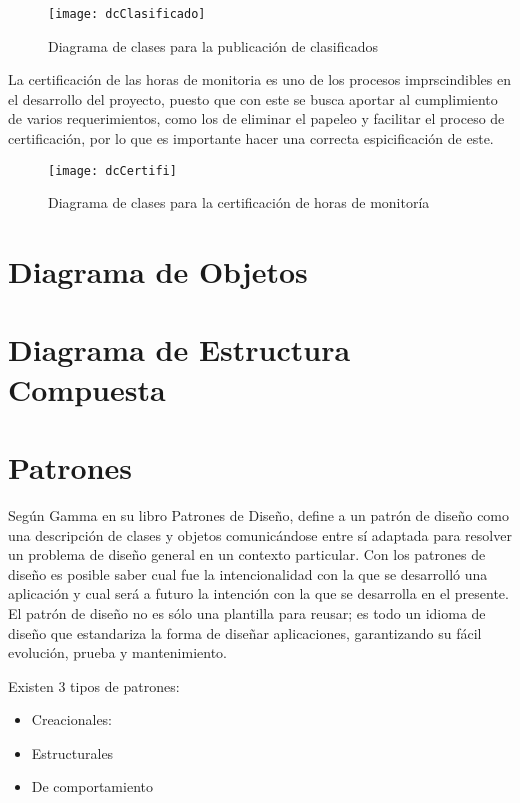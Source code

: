\begin{figure}[H]
	\centering
	\texttt{[image: dcClasificado]}
    \centering
    \caption{Diagrama de clases para la publicación de clasificados}
	\label{fig:dClaClasificado}
\end{figure}
\clearpage
La certificación de las horas de monitoria es uno de los procesos imprscindibles en el desarrollo del proyecto, puesto que con este se busca aportar al cumplimiento de varios requerimientos, como los de eliminar el papeleo y facilitar el proceso de certificación, por lo que es importante hacer una correcta espicificación de este.
\begin{figure}[H]
	\centering
	\texttt{[image: dcCertifi]}
    \centering
    \caption{Diagrama de clases para la certificación de horas de monitoría}
	\label{fig:dClaCertifi}
\end{figure}

\section{Diagrama de Objetos}

\newpage

\section{Diagrama de Estructura Compuesta}

\newpage

\section{Patrones}
Según Gamma en su libro Patrones de Diseño, define a un patrón de diseño como una descripción
de clases y objetos comunicándose
entre sí adaptada para resolver un
problema de diseño general en un
contexto particular. Con los patrones de diseño es posible saber cual fue la intencionalidad con la que se desarrolló una aplicación y cual será a futuro la intención con la que se desarrolla en el presente. El patrón de diseño no es sólo una plantilla para reusar; es todo un idioma de diseño que estandariza la forma de diseñar aplicaciones, garantizando su fácil evolución, prueba y mantenimiento\cite{Bol_2014}.

Existen 3 tipos de patrones:
\begin{itemize}
\item Creacionales: 
\item Estructurales
\item De comportamiento
\end{itemize}
